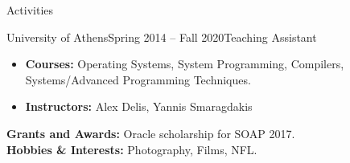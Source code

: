 \documentclass{resume}
\begin{document}
\begin{rSection}{Activities}
  \begin{rSubsection}{University of Athens}{Spring 2014 -- Fall 2020}{Teaching Assistant}{}
    \begin{itemize}[label={-}]
      \setlength\itemsep{-0.5em}
        \item {\bf Courses:}  Operating Systems, System Programming, Compilers, Systems/Advanced Programming Techniques.
        \item {\bf Instructors:} Alex Delis, Yannis Smaragdakis
      \end{itemize}

    {\bf Grants and Awards:} Oracle scholarship for SOAP 2017. \\
    {\bf Hobbies \& Interests:} Photography, Films, NFL.
  \end{rSubsection}
\end{rSection}
\end{document}
